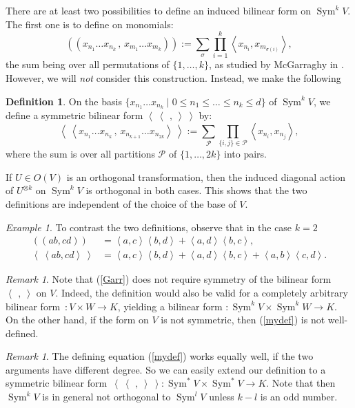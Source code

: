 \documentclass{amsart}
\DeclareMathOperator{\Sym}{Sym}
\newcommand{\coloneqq}{:=}
\newcommand{\bra}{\left<\!\!\!\:\left<}
\newcommand{\ket}{\right>\!\!\!\:\right>}
\theoremstyle{plain}
\theoremstyle{definition}
\newtheorem{definition}[theorem]{Definition}
\theoremstyle{remark}
\newtheorem{remark}[theorem]{Remark}
\newtheorem{example}[theorem]{Example}
\begin{document}
There are at least two possibilities to define an induced bilinear form on $\Sym^kV$. The first one is to define on monomials:
\begin{equation}\label{Garr}
\left(\!\left( x_{n_1}\ldots x_{n_k}\,,\, x_{m_1}\ldots x_{m_k}\right)\!\right) \coloneqq \sum_\sigma  
\prod_{i=1}^k \left< x_{n_i},x_{m_{\sigma(i)}}\right>,
\end{equation}
the sum being over all permutations of $\{1,\ldots,k\}$, as studied by McGarraghy in \cite{McGarr}. However, we will \emph{not} consider 
this construction. Instead, we make the following
\begin{definition} \label{formdef} On the basis $\{x_{n_1}\ldots x_{n_k}\;|\;0\leq n_1\leq\ldots\leq n_k\leq d\}$ of $\Sym^kV$, we define a symmetric bilinear form $\bra\ \,,\ \ket$ by: 
\begin{equation}
\label{mydef}
\bra x_{n_1}\ldots x_{n_k}\,,\,x_{n_{k+1}}\ldots x_{n_{2k}} \ket \coloneqq \sum_{\mathcal{P}} \prod_{\{i,j\}\in\mathcal{P}} \left<x_{n_i},x_{n_j}\right>,
\end{equation}
where the sum is over all partitions $\mathcal{P}$ of $\{1,\ldots,2k\}$ into pairs.
\end{definition}
If $U\in O(V)$ is an orthogonal transformation, then the induced diagonal action of $U^{\otimes k}$ on $\Sym^kV$ is orthogonal in both cases. This shows that the two definitions are independent of the choice of the base of $V$. 
\begin{example}
To contrast the two definitions, observe that in the case $k=2$
\begin{align}
\left(\!\left( ab,cd \right)\!\right) &= \left<a,c\right>\left<b,d\right>+\left<a,d\right>\left<b,c\right>, \\
\bra ab,cd\ket &= \left<a,c\right>\left<b,d\right>+\left<a,d\right>\left<b,c\right> + \left<a,b\right>\left<c,d\right>.
\end{align}
\end{example}
\begin{remark}
Note that (\ref{Garr}) does not require symmetry of the bilinear form $\left<\,\ ,\ \right>$ on $V$. Indeed, the definition would also be valid for a completely arbitrary bilinear form~$: V\times W \rightarrow K$, yielding a bilinear form $:\Sym^kV\times\Sym^kW\rightarrow K$. On the other hand, if the form on $V$ is not symmetric, then (\ref{mydef}) is not well-defined.
\end{remark}
\begin{remark}
The defining equation (\ref{mydef}) works equally well, if the two arguments have different degree. So we can easily extend our definition to a symmetric bilinear form~$\bra\ \,,\ \ket:\Sym^*V\times\Sym^*V \rightarrow K$. Note that then $\Sym^kV$ is in general not orthogonal to $\Sym^lV$ unless $k-l$ is an odd number.
\end{remark}
\end{document}
